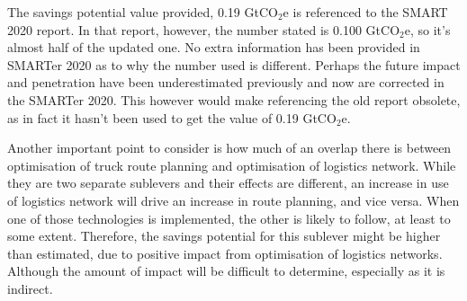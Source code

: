 The savings potential value provided, 0.19 GtCO$_2$e is referenced to the SMART 2020 report. In that report, however, the number stated is 0.100 GtCO$_2$e, so it’s almost half of the updated one. No extra information has been provided in SMARTer 2020 as to why the number used is different. Perhaps the future impact and penetration have been underestimated previously and now are corrected in the SMARTer 2020. This however would make referencing the old report obsolete, as in fact it hasn’t been used to get the value of 0.19 GtCO$_2$e.

Another important point to consider is how much of an overlap there is between optimisation of truck route planning and optimisation of logistics network. While they are two separate sublevers and their effects are different, an increase in use of logistics network will drive an increase in route planning, and vice versa. When one of those technologies is implemented, the other is likely to follow, at least to some extent. Therefore, the savings potential for this sublever might be higher than estimated, due to positive impact from optimisation of logistics networks. Although the amount of impact will be difficult to determine, especially as it is indirect.


